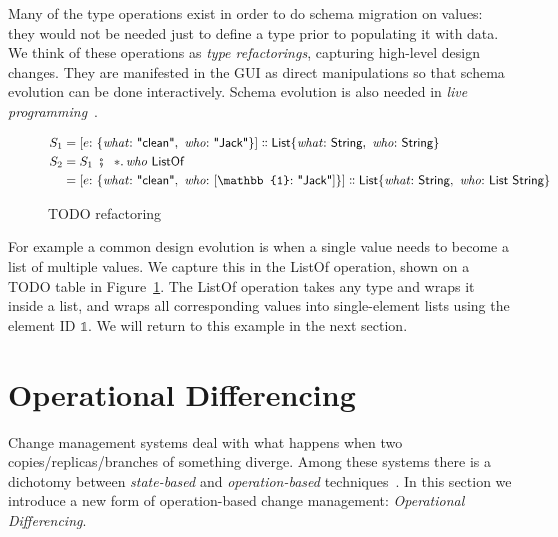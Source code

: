 \documentclass[english,submission]{programming}
\theoremstyle{definition}
\DeclareMathOperator{\exec}{\ \fatsemi\ \ }
\newcommand{\is}{{:}\ }
\newcommand{\comma}{,\ }
\newcommand{\isa}{\dblcolon}
\newcommand{\quotedstring}[1]{\textsf{\textquotedbl{#1}\textquotedbl}}
\begin{document}
Many of the type operations exist in order to do schema migration on values: they would not be needed just to define a type prior to populating it with data. We think of these operations as \textit{type refactorings}, capturing high-level design changes. They are manifested in the GUI as direct manipulations so that schema evolution can be done interactively. Schema evolution is also needed in \textit{live programming}~\cite{challenge-problems}.
\begin{figure}[h]
\begin{align*}
  S_1 &= [
    e \is \{ \mathit{what}\is \quotedstring{clean}\comma  \mathit{who}\is \quotedstring{Jack} \}
    ] \isa
    \textsf{List}\{ \mathit{what}\is \textsf{String}\comma \mathit{who}\is \textsf{String} \}\\
S_2 &= S_1 \exec *\ldotp \mathit{who} \textsf{ ListOf } \\
 &= [
    e \is \{ \mathit{what}\is \quotedstring{clean}\comma  \mathit{who}\is [\mathbb{1}\is \quotedstring{Jack}] \}
    ] \isa
    \textsf{List}\{ \mathit{what}\is \textsf{String}\comma  \mathit{who}\is \textsf{List String} \}\\
\end{align*}
\vspace{-40pt}
\caption{TODO refactoring}
\label{fig:TODO-refactor}
\end{figure}

For example a common design evolution is when a single value needs to become a list of multiple values. We capture this in the \textsf{ListOf} operation, shown on a TODO table in Figure~\ref{fig:TODO-refactor}.
The \textsf{ListOf} operation takes any type and wraps it inside a list, and wraps all corresponding values into single-element lists using the element ID $\mathbb{1}$. We will return to this example in the next section.



\section{Operational Differencing}

Change management systems deal with what happens when two copies/replicas/branches of something diverge.
Among these systems there is a dichotomy between \textit{state-based} and \textit{operation-based} techniques~\cite{diff3, Shapiro11, edit-lenses}.
In this section we introduce a new form of operation-based change management: \textit{Operational Differencing}.
\end{document}
